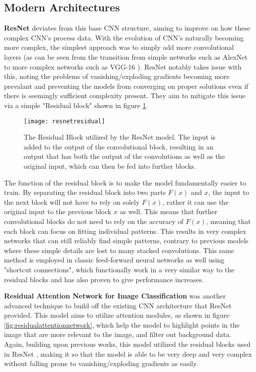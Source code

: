 \subsection{Modern Architectures}

\textbf{ResNet} \cite{resnet} deviates from this base CNN structure, aiming to improve on how these complex CNN's process data. With the evolution of CNN's naturally becoming more complex, the simplest approach was to simply add more convolutional layers (as can be seen from the transition from simple networks such as AlexNet \cite{alexnet} to more complex networks such as VGG-16 \cite{vgg16}). ResNet notably takes issue with this, noting the problems of vanishing/exploding gradients becoming more prevalant and preventing the models from converging on proper solutions even if there is seemingly sufficient complexity present. They aim to mitigate this issue via a simple "Residual block" shown in figure \ref{fig:resnetresidual}.

\begin{figure}[ht]
	\texttt{[image: resnetresidual]}
	\centering
	\caption{The Residual Block utilized by the ResNet \cite{resnet} model. The input is added to the output of the convolutional block, resulting in an output that has both the output of the convolutions as well as the original input, which can then be fed into further blocks.}
	\label{fig:resnetresidual}
\end{figure}

The function of the residual block is to make the model fundamentally easier to train. By separating the residual block into two parts $F(x)$ and $x$, the input to the next block will not have to rely on solely $F(x)$, rather it can use the original input to the previous block $x$ as well. This means that further convolutional blocks do not need to rely on the accuracy of $F(x)$, meaning that each block can focus on fitting individual patterns. This results in very complex networks that can still reliably find simple patterns, contrary to previous models where these simple details are lost to many stacked convolutions. This same method is employed in classic feed-forward neural networks as well using "shortcut connections", which functionally work in a very similar way to the residual blocks and has also proven to give performance increases.

\textbf{Residual Attention Network for Image Classification} \cite{residualattentionnetwork} was another advanced technique to build off the existing CNN architecture that ResNet provided. This model aims to utilize attention modules, as shown in figure \ref{fig:residualattentionnetwork}, which help the model to highlight points in the image that are more relevant to the image, and filter out background data. Again, building upon previous works, this model utilized the residual blocks used in ResNet \cite{resnet}, making it so that the model is able to be very deep and very complex without falling prone to vanishing/exploding gradients as easily.

